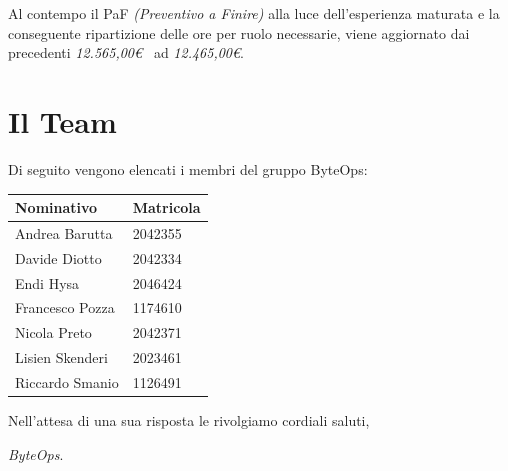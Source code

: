 \documentclass{article}
\begin{document}
Al contempo il PaF \textit{(Preventivo a Finire)} alla luce dell'esperienza maturata e la conseguente ripartizione delle ore per ruolo necessarie, viene aggiornato dai precedenti \textit{12.565,00\euro\ } ad \textit{12.465,00\euro }.

\section{Il Team}
Di seguito vengono elencati i membri del gruppo ByteOps:

\vspace{1cm}

\begin{center}
    \begin{tabular}{|C{4cm}|C{2cm}|}
    \hline
        \textbf{Nominativo} & \textbf{Matricola} \\
        \hline\hline
        Andrea Barutta  & 2042355 \\
        \hline
        Davide Diotto   & 2042334 \\ 
        \hline
        Endi Hysa       & 2046424 \\ 
        \hline
        Francesco Pozza & 1174610 \\ 
        \hline
        Nicola Preto    & 2042371 \\ 
        \hline
        Lisien Skenderi & 2023461 \\ 
        \hline
        Riccardo Smanio & 1126491 \\ 
        \hline
    \end{tabular}
\end{center}

\vspace{1cm}
Nell'attesa di una sua risposta le rivolgiamo cordiali saluti,

\vspace{0.3cm}

\textit{ByteOps}.
\end{document}
